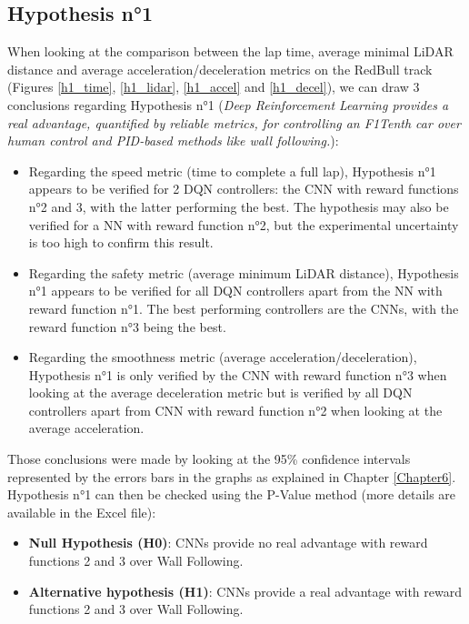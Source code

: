 \subsection{Hypothesis n°1}
\label{reflexions_h1}
When looking at the comparison between the lap time, average minimal LiDAR distance and average acceleration/deceleration metrics on the RedBull track (Figures \ref{h1_time}, \ref{h1_lidar}, \ref{h1_accel} and \ref{h1_decel}), we can draw 3 conclusions regarding Hypothesis n°1 (\textit{Deep Reinforcement Learning provides a real advantage, quantified by reliable metrics, for controlling an F1Tenth car over human control and PID-based methods like wall following.}):
\begin{itemize}
	\item  Regarding the speed metric (time to complete a full lap), Hypothesis n°1 appears to be verified for 2 DQN controllers: the CNN with reward functions n°2 and 3, with the latter performing the best. The hypothesis may also be verified for a NN with reward function n°2, but the experimental uncertainty is too high to confirm this result.
	\item Regarding the safety metric (average minimum LiDAR distance), Hypothesis n°1 appears to be verified for all DQN controllers apart from the NN with reward function n°1. The best performing controllers are the CNNs, with the reward function n°3 being the best.
	\item Regarding the smoothness metric (average acceleration/deceleration), Hypothesis n°1 is only verified by the CNN with reward function n°3 when looking at the average deceleration metric but is verified by all DQN controllers apart from CNN with reward function n°2 when looking at the average acceleration. 
\end{itemize}

Those conclusions were made by looking at the 95\% confidence intervals represented by the errors bars in the graphs as explained in  Chapter \ref{Chapter6}. \\
Hypothesis n°1 can then be checked using the P-Value method (more details are available in the Excel file): \\

\begin{itemize}
	\item \textbf{Null Hypothesis (H0)}: CNNs provide no real advantage with reward functions 2 and 3 over Wall Following. 
	\item \textbf{Alternative hypothesis (H1)}: CNNs provide a real advantage with reward functions 2 and 3 over Wall Following.
\end{itemize}


